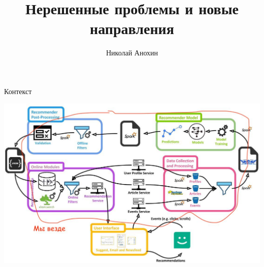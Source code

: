\documentclass[11pt,aspectratio=169,handout]{beamer}
\author{Николай Анохин}
\title{Нерешенные проблемы и новые направления}
\begin{document}
{

\begin{frame}
\titlepage
\end{frame}


}

\begin{frame}{Контекст}

\begin{center}
\includegraphics[scale=0.23]{images/mendeley.jpeg}
\end{center}

\end{frame}
\end{document}
